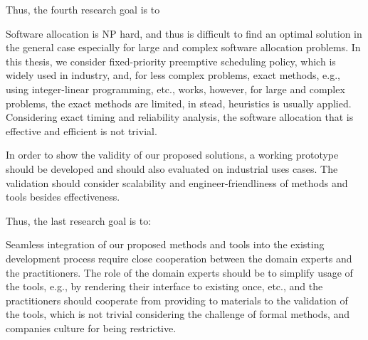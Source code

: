 Thus, the fourth research goal is to
\begin{researchgoal}
\end{researchgoal}

Software allocation is NP hard, and thus is difficult to find an optimal solution in the general case especially for large and complex software allocation problems. In this thesis, we consider fixed-priority preemptive scheduling policy, which is widely used in industry, and, for less complex problems, exact methods, e.g., using integer-linear programming, etc., works, however, for large and complex problems, the exact methods are limited, in stead, heuristics is usually applied. Considering exact timing and reliability analysis, the software allocation that is effective and efficient is not trivial.

In order to show the validity of our proposed solutions, a working prototype should be developed and should also evaluated on industrial uses cases. The validation should consider scalability and engineer-friendliness of methods and tools besides effectiveness. 

Thus, the last research goal is to:
\begin{researchgoal}
\end{researchgoal}

Seamless integration of our proposed methods and tools into the existing development process require close cooperation between the domain experts and the practitioners. The role of the domain experts should be to simplify usage of the tools, e.g., by rendering their interface to existing once, etc., and the practitioners should cooperate from providing to materials to the validation of the tools, which is not trivial considering the challenge of formal methods, and companies culture for being restrictive.
